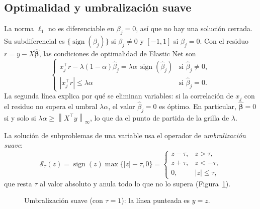 \documentclass[11pt,a4paper]{article}
\newcommand{\norm}[1]{\left\lVert #1 \right\rVert}
\newcommand{\bh}{\hat{\bm{\beta}}}
\DeclareMathOperator{\sign}{sign}
\newcommand{\soft}{\mathcal{S}}
\theoremstyle{simple}
\begin{document}
\subsection{Optimalidad y umbralización suave}
La norma $\ell_1$ no es diferenciable en $\beta_j=0$, así que no hay una solución cerrada. Su subdiferencial es $\{\sign(\beta_j)\}$ si $\beta_j\ne0$ y $[-1,1]$ si $\beta_j=0$. Con el residuo $r=y-X\bh$, las condiciones de optimalidad de Elastic Net son
\begin{equation}\label{eq:kkt}
\begin{cases}
x_j^\top r-\lambda(1-\alpha)\hat\beta_j=\lambda\alpha\,\sign(\hat\beta_j) & \text{si } \hat\beta_j\ne0,\\[2pt]
|x_j^\top r|\le\lambda\alpha & \text{si } \hat\beta_j=0.
\end{cases}
\end{equation}
La segunda línea explica por qué se eliminan variables: si la correlación de $x_j$ con el residuo no supera el umbral $\lambda\alpha$, el valor $\hat\beta_j=0$ es óptimo. En particular, $\bh=0$ si y solo si $\lambda\alpha\ge\norm{X^\top y}_\infty$, lo que da el punto de partida de la grilla de $\lambda$.

La solución de subproblemas de una variable usa el operador de \emph{umbralización suave}:
\begin{equation}\label{eq:soft}
\soft_\tau(z)=\sign(z)\max\{|z|-\tau,0\}=\begin{cases}z-\tau,& z>\tau,\\ z+\tau,& z<-\tau,\\ 0,& |z|\le\tau,\end{cases}
\end{equation}
que resta $\tau$ al valor absoluto y anula todo lo que no lo supera (Figura~\ref{fig:soft}).

\begin{figure}[H]
\centering
{}
\caption{Umbralización suave (con $\tau=1$): la línea punteada es $y=z$.}
\label{fig:soft}
\end{figure}
\end{document}
